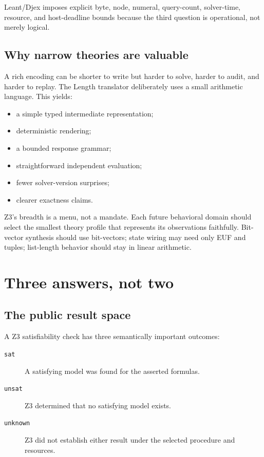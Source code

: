 \documentclass[10pt,letterpaper,oneside]{report}
\newcommand{\sat}{\texttt{sat}}
\newcommand{\unsat}{\texttt{unsat}}
\newcommand{\unknown}{\texttt{unknown}}
\begin{document}
Leant/Djex imposes explicit byte, node, numeral, query-count, solver-time, resource, and host-deadline bounds because the third question is operational, not merely logical.

\section{Why narrow theories are valuable}

A rich encoding can be shorter to write but harder to solve, harder to audit, and harder to replay. The Length translator deliberately uses a small arithmetic language. This yields:

\begin{itemize}
\item a simple typed intermediate representation;
\item deterministic rendering;
\item a bounded response grammar;
\item straightforward independent evaluation;
\item fewer solver-version surprises;
\item clearer exactness claims.
\end{itemize}

\begin{projectnote}
Z3's breadth is a menu, not a mandate. Each future behavioral domain should select the smallest theory profile that represents its observations faithfully. Bit-vector synthesis should use bit-vectors; state wiring may need only EUF and tuples; list-length behavior should stay in linear arithmetic.
\end{projectnote}

\chapter{Three answers, not two}
\label{chap:three-answers}

\section{The public result space}

A Z3 satisfiability check has three semantically important outcomes:

\begin{description}
\item[\sat] A satisfying model was found for the asserted formulas.
\item[\unsat] Z3 determined that no satisfying model exists.
\item[\unknown] Z3 did not establish either result under the selected procedure and resources.
\end{description}
\end{document}
